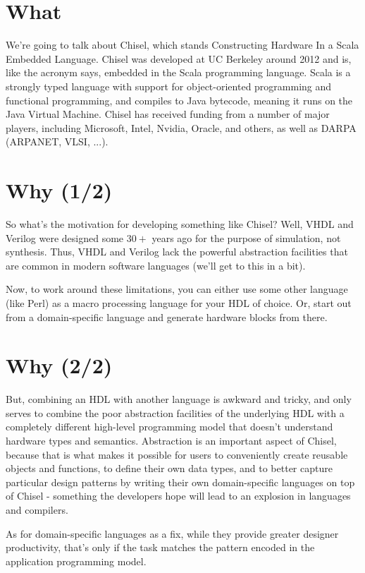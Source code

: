 \documentclass[a4paper,11pt]{article}
\begin{document}
\section{What}

We're going to talk about Chisel, which stands Constructing Hardware In a Scala Embedded Language. Chisel was developed at UC Berkeley around 2012 and is, like the acronym says, embedded in the Scala programming language. Scala is a strongly typed language with support for object-oriented programming and functional programming, and compiles to Java bytecode, meaning it runs on the Java Virtual Machine. Chisel has received funding from a number of major players, including Microsoft, Intel, Nvidia, Oracle, and others, as well as DARPA (ARPANET, VLSI, ...).

\section{Why (1/2)}

So what's the motivation for developing something like Chisel? Well, VHDL and Verilog were designed some $30+$ years ago for the purpose of simulation, not synthesis. Thus, VHDL and Verilog lack the powerful abstraction facilities that are common in modern software languages (we'll get to this in a bit).

Now, to work around these limitations, you can either use some other language (like Perl) as a macro processing language for your HDL of choice. Or, start out from a domain-specific language and generate hardware blocks from there.

\section{Why (2/2)}

But, combining an HDL with another language is awkward and tricky, and only serves to combine the poor abstraction facilities of the underlying HDL with a completely different high-level programming model that doesn't understand hardware types and semantics. Abstraction is an important aspect of Chisel, because that is what makes it possible for users to conveniently create reusable objects and functions, to define their own data types, and to better capture particular design patterns by writing their own domain-specific languages on top of Chisel - something the developers hope will lead to an explosion in languages and compilers.

As for domain-specific languages as a fix, while they provide greater designer productivity, that's only if the task matches the pattern encoded in the application programming model.
\end{document}
